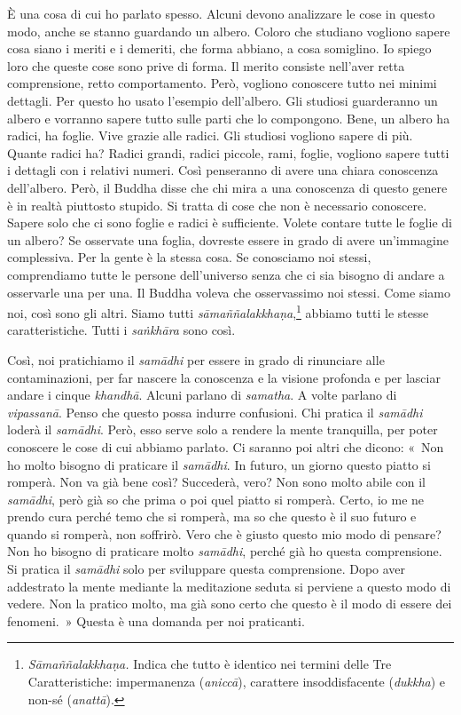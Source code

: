 È una cosa di cui ho parlato spesso. Alcuni devono analizzare le cose in
questo modo, anche se stanno guardando un albero. Coloro che studiano
vogliono sapere cosa siano i meriti e i demeriti, che forma abbiano, a
cosa somiglino. Io spiego loro che queste cose sono prive di forma. Il
merito consiste nell'aver retta comprensione, retto comportamento. Però,
vogliono conoscere tutto nei minimi dettagli. Per questo ho usato
l'esempio dell'albero. Gli studiosi guarderanno un albero e vorranno
sapere tutto sulle parti che lo compongono. Bene, un albero ha radici,
ha foglie. Vive grazie alle radici. Gli studiosi vogliono sapere di più.
Quante radici ha? Radici grandi, radici piccole, rami, foglie, vogliono
sapere tutti i dettagli con i relativi numeri. Così penseranno di avere
una chiara conoscenza dell'albero. Però, il Buddha disse che chi mira a
una conoscenza di questo genere è in realtà piuttosto stupido. Si tratta
di cose che non è necessario conoscere. Sapere solo che ci sono foglie e
radici è sufficiente. Volete contare tutte le foglie di un albero? Se
osservate una foglia, dovreste essere in grado di avere un'immagine
complessiva. Per la gente è la stessa cosa. Se conosciamo noi stessi,
comprendiamo tutte le persone dell'universo senza che ci sia bisogno di
andare a osservarle una per una. Il Buddha voleva che osservassimo noi
stessi. Come siamo noi, così sono gli altri. Siamo tutti
\emph{sāmaññalakkhaṇa},\footnote{\emph{Sāmaññalakkhaṇa.} Indica che
  tutto è identico nei termini delle Tre Caratteristiche: impermanenza
  (\emph{aniccā}), carattere insoddisfacente (\emph{dukkha}) e non-sé
  (\emph{anattā}).} abbiamo tutti le stesse caratteristiche. Tutti i
\emph{saṅkhāra} sono così.

Così, noi pratichiamo il \emph{samādhi} per essere in grado di
rinunciare alle contaminazioni, per far nascere la conoscenza e la
visione profonda e per lasciar andare i cinque \emph{khandhā}. Alcuni
parlano di \emph{samatha}. A volte parlano di \emph{vipassanā}. Penso
che questo possa indurre confusioni. Chi pratica il \emph{samādhi}
loderà il \emph{samādhi}. Però, esso serve solo a rendere la mente
tranquilla, per poter conoscere le cose di cui abbiamo parlato. Ci
saranno poi altri che dicono: «~Non ho molto bisogno di praticare il
\emph{samādhi}. In futuro, un giorno questo piatto si romperà. Non va
già bene così? Succederà, vero? Non sono molto abile con il
\emph{samādhi}, però già so che prima o poi quel piatto si romperà.
Certo, io me ne prendo cura perché temo che si romperà, ma so che questo
è il suo futuro e quando si romperà, non soffrirò. Vero che è giusto
questo mio modo di pensare? Non ho bisogno di praticare molto
\emph{samādhi}, perché già ho questa comprensione. Si pratica il
\emph{samādhi} solo per sviluppare questa comprensione. Dopo aver
addestrato la mente mediante la meditazione seduta si perviene a questo
modo di vedere. Non la pratico molto, ma già sono certo che questo è il
modo di essere dei fenomeni.~» Questa è una domanda per noi praticanti.

